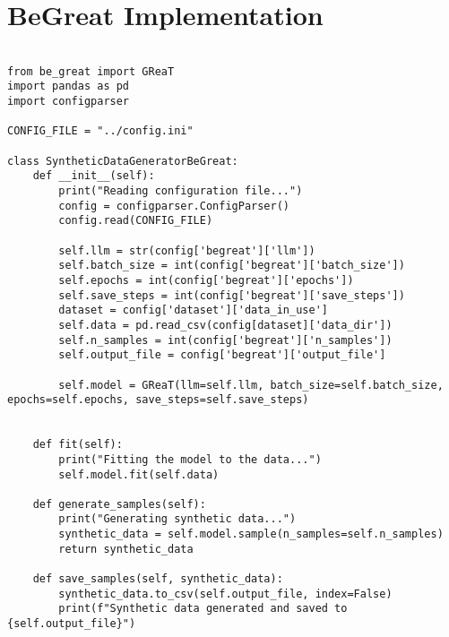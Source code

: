 \chapter*{BeGreat Implementation}
\label{app:begreat_implementation}

\begin{verbatim}

from be_great import GReaT
import pandas as pd
import configparser

CONFIG_FILE = "../config.ini"

class SyntheticDataGeneratorBeGreat:
    def __init__(self):
        print("Reading configuration file...")
        config = configparser.ConfigParser()
        config.read(CONFIG_FILE)

        self.llm = str(config['begreat']['llm'])
        self.batch_size = int(config['begreat']['batch_size'])
        self.epochs = int(config['begreat']['epochs'])
        self.save_steps = int(config['begreat']['save_steps'])
        dataset = config['dataset']['data_in_use']
        self.data = pd.read_csv(config[dataset]['data_dir'])
        self.n_samples = int(config['begreat']['n_samples']) 
        self.output_file = config['begreat']['output_file']

        self.model = GReaT(llm=self.llm, batch_size=self.batch_size, epochs=self.epochs, save_steps=self.save_steps)


    def fit(self):
        print("Fitting the model to the data...")
        self.model.fit(self.data)
    
    def generate_samples(self):
        print("Generating synthetic data...")
        synthetic_data = self.model.sample(n_samples=self.n_samples)
        return synthetic_data
    
    def save_samples(self, synthetic_data):
        synthetic_data.to_csv(self.output_file, index=False)
        print(f"Synthetic data generated and saved to {self.output_file}")

\end{verbatim}